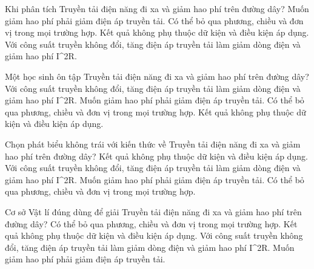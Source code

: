 \begin{ex}
Khi phân tích Truyền tải điện năng đi xa và giảm hao phí trên đường dây?
\choice
{Muốn giảm hao phí phải giảm điện áp truyền tải.}
{Có thể bỏ qua phương, chiều và đơn vị trong mọi trường hợp.}
{Kết quả không phụ thuộc dữ kiện và điều kiện áp dụng.}
{\True Với công suất truyền không đổi, tăng điện áp truyền tải làm giảm dòng điện và giảm hao phí I^2R.}
\end{ex}

\begin{ex}
Một học sinh ôn tập Truyền tải điện năng đi xa và giảm hao phí trên đường dây?
\choice
{\True Với công suất truyền không đổi, tăng điện áp truyền tải làm giảm dòng điện và giảm hao phí I^2R.}
{Muốn giảm hao phí phải giảm điện áp truyền tải.}
{Có thể bỏ qua phương, chiều và đơn vị trong mọi trường hợp.}
{Kết quả không phụ thuộc dữ kiện và điều kiện áp dụng.}
\end{ex}

\begin{ex}
Chọn phát biểu không trái với kiến thức về Truyền tải điện năng đi xa và giảm hao phí trên đường dây?
\choice
{Kết quả không phụ thuộc dữ kiện và điều kiện áp dụng.}
{\True Với công suất truyền không đổi, tăng điện áp truyền tải làm giảm dòng điện và giảm hao phí I^2R.}
{Muốn giảm hao phí phải giảm điện áp truyền tải.}
{Có thể bỏ qua phương, chiều và đơn vị trong mọi trường hợp.}
\end{ex}

\begin{ex}
Cơ sở Vật lí đúng dùng để giải Truyền tải điện năng đi xa và giảm hao phí trên đường dây?
\choice
{Có thể bỏ qua phương, chiều và đơn vị trong mọi trường hợp.}
{Kết quả không phụ thuộc dữ kiện và điều kiện áp dụng.}
{\True Với công suất truyền không đổi, tăng điện áp truyền tải làm giảm dòng điện và giảm hao phí I^2R.}
{Muốn giảm hao phí phải giảm điện áp truyền tải.}
\end{ex}

